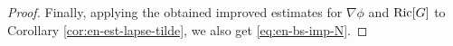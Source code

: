 \documentclass[11pt,leqno,textwidth=10cm]{amsart}
\numberwithin{equation}{section}
\theoremstyle{definition}
\theoremstyle{plain}
\newcommand{\1}{\mathbbm{1}}
\newcommand{\E}{\mathcal{E}}
\newcommand{\Ric}{\text{\normalfont{Ric}}}
\renewcommand{\epsilon}{\varepsilon}
\newcommand{\Lap}{\Delta}
\begin{document}
{\begin{proof}
Finally, applying the obtained improved estimates for $\nabla\phi$ and $\Ric[G]$ to Corollary \ref{cor:en-est-lapse-tilde}, we also get \eqref{eq:en-bs-imp-N}. 
\end{proof}}
\end{document}
